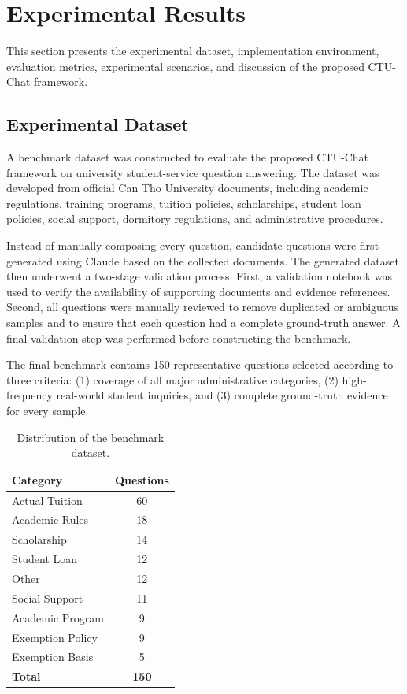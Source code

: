 \FloatBarrier

\section{Experimental Results}
\label{sec:exp}
\suppressfloats[t]

This section presents the experimental dataset, implementation environment,
evaluation metrics, experimental scenarios, and discussion of the proposed
CTU-Chat framework.

\subsection{Experimental Dataset}

A benchmark dataset was constructed to evaluate the proposed CTU-Chat
framework on university student-service question answering. The dataset was
developed from official Can Tho University documents, including academic
regulations, training programs, tuition policies, scholarships, student loan
policies, social support, dormitory regulations, and administrative procedures.

Instead of manually composing every question, candidate questions were first
generated using Claude based on the collected documents. The generated dataset
then underwent a two-stage validation process. First, a validation notebook was
used to verify the availability of supporting documents and evidence references.
Second, all questions were manually reviewed to remove duplicated or ambiguous
samples and to ensure that each question had a complete ground-truth answer.
A final validation step was performed before constructing the benchmark.

The final benchmark contains 150 representative questions selected according to
three criteria: (1) coverage of all major administrative categories,
(2) high-frequency real-world student inquiries, and (3) complete
ground-truth evidence for every sample.

\begin{table}[!htbp]
\centering
\caption{Distribution of the benchmark dataset.}
\label{tab:dataset}
\begin{tabular}{lc}
\toprule
Category & Questions \\
\midrule
Actual Tuition & 60 \\
Academic Rules & 18 \\
Scholarship & 14 \\
Student Loan & 12 \\
Other & 12 \\
Social Support & 11 \\
Academic Program & 9 \\
Exemption Policy & 9 \\
Exemption Basis & 5 \\
\midrule
\textbf{Total} & \textbf{150} \\
\bottomrule
\end{tabular}
\end{table}

